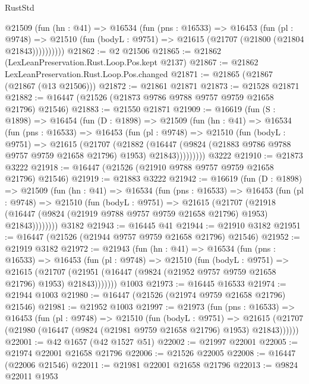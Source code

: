 \begin{lexlean}{RustStd}
\begin{coremodule}
        @21509
          (fun (hn : @41) =>
          @16534
            (fun (pns : @16533) =>
            @16453
              (fun (pl : @9748) =>
              @21510 (fun (bodyL : @9751) => @21615 (@21707 (@21800 (@21804 @21843))))))))))
@21862 := @2 @21506
@21865 := @21862 (LexLeanPreservation.Rust.Loop.Pos.kept @2137)
@21867 := @21862 LexLeanPreservation.Rust.Loop.Pos.changed
@21871 := @21865 (@21867 (@21867 (@13 @21506)))
@21872 := @21861 @21871
@21873 := @21528 @21871
@21882 := @16447 (@21526 (@21873 @9786 @9788 @9757 @9759 @21658 @21796) @21546)
@21883 := @21550 @21871
@21909 := @16619
    (fun (S : @1898) =>
    @16454
      (fun (D : @1898) =>
      @21509
        (fun (hn : @41) =>
        @16534
          (fun (pns : @16533) =>
          @16453
            (fun (pl : @9748) =>
            @21510
              (fun (bodyL : @9751) =>
              @21615
                (@21707
                  (@21882
                    (@16447
                      (@9824 (@21883 @9786 @9788 @9757 @9759 @21658 @21796) @1953)
                      @21843)))))))))
    @3222
@21910 := @21873 @3222
@21918 := @16447 (@21526 (@21910 @9788 @9757 @9759 @21658 @21796) @21546)
@21919 := @21883 @3222
@21942 := @16619
    (fun (D : @1898) =>
    @21509
      (fun (hn : @41) =>
      @16534
        (fun (pns : @16533) =>
        @16453
          (fun (pl : @9748) =>
          @21510
            (fun (bodyL : @9751) =>
            @21615
              (@21707
                (@21918
                  (@16447 (@9824 (@21919 @9788 @9757 @9759 @21658 @21796) @1953) @21843))))))))
    @3182
@21943 := @16445 @41
@21944 := @21910 @3182
@21951 := @16447 (@21526 (@21944 @9757 @9759 @21658 @21796) @21546)
@21952 := @21919 @3182
@21972 := @21943
    (fun (hn : @41) =>
    @16534
      (fun (pns : @16533) =>
      @16453
        (fun (pl : @9748) =>
        @21510
          (fun (bodyL : @9751) =>
          @21615
            (@21707 (@21951 (@16447 (@9824 (@21952 @9757 @9759 @21658 @21796) @1953) @21843)))))))
    @1003
@21973 := @16445 @16533
@21974 := @21944 @1003
@21980 := @16447 (@21526 (@21974 @9759 @21658 @21796) @21546)
@21981 := @21952 @1003
@21997 := @21973
    (fun (pns : @16533) =>
    @16453
      (fun (pl : @9748) =>
      @21510
        (fun (bodyL : @9751) =>
        @21615 (@21707 (@21980 (@16447 (@9824 (@21981 @9759 @21658 @21796) @1953) @21843))))))
@22001 := @42 @1657 (@42 @1527 @51)
@22002 := @21997 @22001
@22005 := @21974 @22001 @21658 @21796
@22006 := @21526 @22005
@22008 := @16447 (@22006 @21546)
@22011 := @21981 @22001 @21658 @21796
@22013 := @9824 @22011 @1953

\end{coremodule}
\end{lexlean}
